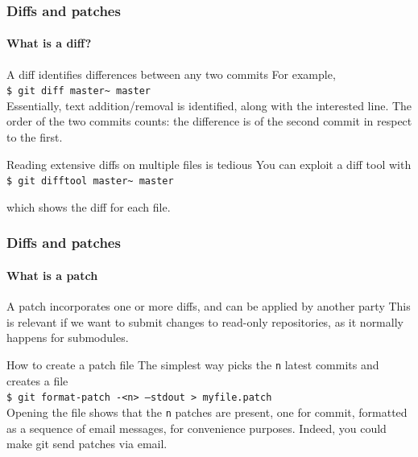 \begin{frame}
\frametitle{Diffs and patches}
\framesubtitle{What is a diff?}

\begin{block}{A diff identifies differences between any two commits}
For example, \\
\texttt{\$ git diff master\textasciitilde{} master} \\

\medskip
Essentially, text addition/removal is identified, along with the interested line. The order of the two commits counts: the difference is of the second commit in respect to the first. 
\end{block}

\pause
\begin{block}{Reading extensive diffs on multiple files is tedious}
You can exploit a diff tool with \\
\texttt{\$ git difftool master\textasciitilde{} master}

\medskip
which shows the diff for each file.
\end{block}

\end{frame}

\begin{frame}
\frametitle{Diffs and patches}
\framesubtitle{What is a patch}

\begin{block}{A patch incorporates one or more diffs, and can be applied by another party}
This is relevant if we want to submit changes to read-only repositories, as it normally happens for submodules.
\end{block}
\pause

\begin{block}{How to create a patch file}
The simplest way picks the \texttt{n} latest commits and creates a file \\
\texttt{\$ git format-patch -<n> ---stdout > myfile.patch} \\
\medskip
Opening the file shows that the \texttt{n} patches are present, one for commit, formatted as a sequence of email messages, for convenience purposes. 
Indeed, you could make git send patches via email.
\end{block}

\end{frame}

